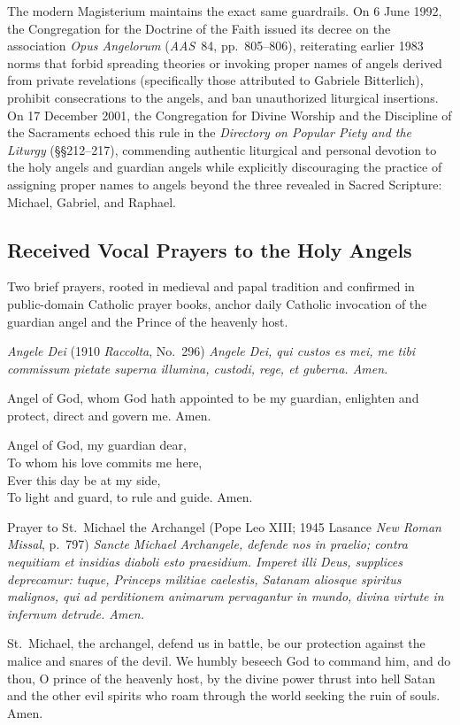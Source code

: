 The modern Magisterium maintains the exact same guardrails. On 6 June 1992, the Congregation for the Doctrine of the Faith issued its decree on the association \emph{Opus Angelorum} (\emph{AAS}~84, pp.~805--806), reiterating earlier 1983 norms that forbid spreading theories or invoking proper names of angels derived from private revelations (specifically those attributed to Gabriele Bitterlich), prohibit consecrations to the angels, and ban unauthorized liturgical insertions. On 17 December 2001, the Congregation for Divine Worship and the Discipline of the Sacraments echoed this rule in the \emph{Directory on Popular Piety and the Liturgy} (\S\S212--217), commending authentic liturgical and personal devotion to the holy angels and guardian angels while explicitly discouraging the practice of assigning proper names to angels beyond the three revealed in Sacred Scripture: Michael, Gabriel, and Raphael.

\subsection{Received Vocal Prayers to the Holy Angels}

Two brief prayers, rooted in medieval and papal tradition and confirmed in public-domain Catholic prayer books, anchor daily Catholic invocation of the guardian angel and the Prince of the heavenly host.

\begin{studybox}{\emph{Angele Dei} (1910 \emph{Raccolta}, No.~296)}
\emph{Angele Dei, qui custos es mei, me tibi commissum pietate superna illumina, custodi, rege, et guberna. Amen.}\par\medskip
Angel of God, whom God hath appointed to be my guardian, enlighten and protect, direct and govern me. Amen.\par\medskip
Angel of God, my guardian dear,\\
To whom his love commits me here,\\
Ever this day be at my side,\\
To light and guard, to rule and guide. Amen.
\end{studybox}

\begin{studybox}{Prayer to St.~Michael the Archangel (Pope Leo XIII; 1945 Lasance \emph{New Roman Missal}, p.~797)}
\emph{Sancte Michael Archangele, defende nos in praelio; contra nequitiam et insidias diaboli esto praesidium. Imperet illi Deus, supplices deprecamur: tuque, Princeps militiae caelestis, Satanam aliosque spiritus malignos, qui ad perditionem animarum pervagantur in mundo, divina virtute in infernum detrude. Amen.}\par\medskip
St.~Michael, the archangel, defend us in battle, be our protection against the malice and snares of the devil. We humbly beseech God to command him, and do thou, O prince of the heavenly host, by the divine power thrust into hell Satan and the other evil spirits who roam through the world seeking the ruin of souls. Amen.
\end{studybox}

